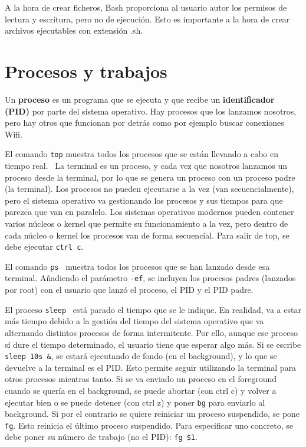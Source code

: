 \begin{table}[htbp]
\begin{mdframed}[backgroundcolor=black!10]
    \centering
    A la hora de crear ficheros, Bash proporciona al usuario autor los permisos de lectura y escritura, pero no de ejecución. Esto es importante a la hora de crear archivos ejecutables con extensión .sh.
    \end{mdframed}
\end{table}

\section{Procesos y trabajos}
Un \textbf{proceso} es un programa que se ejecuta y que recibe un \textbf{identificador (PID)} por parte del sistema operativo. Hay procesos que los lanzamos nosotros, pero hay otros que funcionan por detrás como por ejemplo buscar conexiones Wifi. 

El comando \texttt{top} muestra todos los procesos que se están llevando a cabo en tiempo real.  \ La terminal es un proceso, y cada vez que nosotros lanzamos un proceso desde la terminal, por lo que se genera un proceso con un proceso padre (la terminal). Los procesos no pueden ejecutarse a la vez (van secuencialmente), pero el sistema operativo va gestionando los procesos y sus tiempos para que parezca que van en paralelo. Los sistemas operativos modernos pueden contener varios núcleos o kernel que permite su funcionamiento a la vez, pero dentro de cada núcleo o kernel los procesos van de forma secuencial. Para salir de top, se debe ejecutar \texttt{ctrl c}.

El comando \texttt{ps} \marginpar[\footnotesize ps] \ muestra todos los procesos que se han lanzado desde esa terminal. Añadiendo el parámetro \texttt{-ef}, se incluyen los procesos padres (lanzados por root) con el usuario que lanzó el proceso, el PID y el PID padre.

El proceso \texttt{sleep}  \ está parado el tiempo que se le indique. En realidad, va a estar más tiempo debido a la gestión del tiempo del sistema operativo que va alternando distintos procesos de forma intermitente. Por ello, aunque ese proceso sí dure el tiempo determinado, el usuario tiene que esperar algo más. Si se escribe \texttt{sleep 10s \&}, se estará ejecutando de fondo (en el background), y lo que se devuelve a la terminal es el PID. Esto permite seguir utilizando la terminal para otros procesos mientras tanto. Si se va enviado un proceso en el foreground cuando se quería en el background, se puede abortar (con ctrl c) y volver a ejecutar bien o se puede detener (con ctrl z) y poner \texttt{bg} para enviarlo al background. Si por el contrario se quiere reiniciar un proceso suspendido, se pone \texttt{fg}. Esto reinicia el último proceso suspendido. Para especificar uno concreto, se debe poner su número de trabajo (no el PID): \texttt{fg \$1}. 

